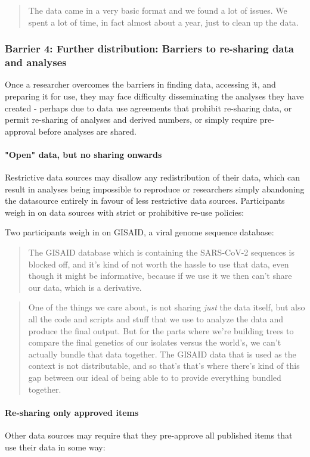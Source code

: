 \documentclass{CUP-JNL-DAP}%
\begin{document}
\blockquote{The data came in a very basic format and we found a lot of issues. We spent a lot of time, in fact almost about a year, just to clean up the data.}

\subsubsection{Barrier 4: Further distribution: Barriers to re-sharing data and analyses}

Once a researcher overcomes the barriers in finding data, accessing it, and preparing it for use, they may face difficulty disseminating the analyses they have created - perhaps due to data use agreements that prohibit re-sharing data, or permit re-sharing of analyses and derived numbers, or simply  require pre-approval before analyses are shared. 

\paragraph{"Open" data, but no sharing onwards}

Restrictive data sources may disallow any redistribution of their data, which can result in analyses being impossible to reproduce or researchers simply abandoning the datasource entirely in favour of less restrictive data sources. Participants weigh in on data sources with strict or prohibitive re-use policies: 

 Two participants weigh in on GISAID, a viral genome sequence database: 
\blockquote{The GISAID database which is containing the SARS-CoV-2 sequences is blocked off, and it's kind of not worth the hassle to use that data, even though it might be informative, because if we use it we then can't share our data, which is a derivative.}

\blockquote{One of the things we care about, is not sharing \textit{just} the data itself, but also all the code and scripts and stuff that we use to analyze the data and produce the final output. But for the parts where we're building trees to compare the final genetics of our isolates versus the world's, we can't actually bundle that data together. The GISAID data that is used as the context is not distributable, and so that's that's where there's kind of this gap between our ideal of being able to to provide everything bundled together. }

\paragraph{Re-sharing only approved items}
Other data sources may require that they pre-approve all published items that use their data in some way:
\end{document}

